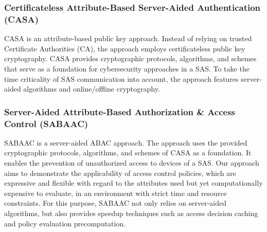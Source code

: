 \subsubsection*{Certificateless Attribute-Based Server-Aided Authentication (CASA)}
CASA is an attribute-based public key approach.
Instead of relying on trusted Certificate Authorities (CA), the approach employs certificateless public key cryptography.
CASA provides cryptographic protocols, algorithms, and schemes that serve as a foundation for cybersecurity approaches in a SAS.
To take the time criticality of SAS communication into account, the approach features server-aided algorithms and online/offline cryptography.

\subsubsection*{Server-Aided Attribute-Based Authorization \& Access Control (SABAAC)}
SABAAC is a server-aided ABAC approach.
The approach uses the provided cryptographic protocols, algorithms, and schemes of CASA as a foundation.
It enables the prevention of unauthorized access to devices of a SAS.
Our approach aims to demonstrate the applicability of access control policies, which are expressive and flexible with regard to the attributes used but yet computationally expensive to evaluate, in an environment with strict time and resource constraints.
For this purpose, SABAAC not only relies on server-aided algorithms, but also provides speedup techniques such as access decision caching and policy evaluation precomputation.
